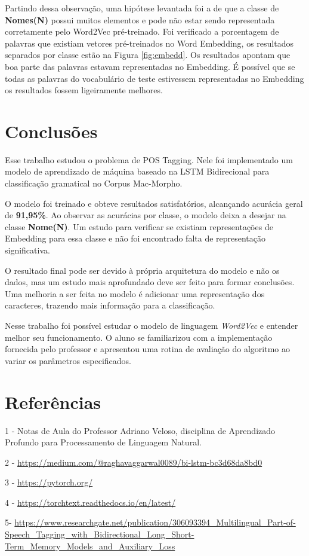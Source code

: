\documentclass[11pt]{scrartcl} %
\begin{document}
Partindo dessa observação, uma hipótese levantada foi a de que a classe de \textbf{Nomes(N)} possui muitos elementos e pode não estar sendo representada corretamente pelo Word2Vec pré-treinado. Foi verificado a porcentagem de palavras que existiam vetores pré-treinados no Word Embedding, os resultados separados por classe estão na Figura \ref{fig:embedd}. Os resultados apontam que boa parte das palavras estavam representadas no Embedding. É possível que se todas as palavras do vocabulário de teste estivessem representadas no Embedding os resultados fossem ligeiramente melhores.

\section{Conclusões}

Esse trabalho estudou o problema de POS Tagging. Nele foi implementado um modelo de aprendizado de máquina baseado na LSTM Bidirecional para classificação gramatical no Corpus Mac-Morpho. 

O modelo foi treinado e obteve resultados satisfatórios, alcançando acurácia geral de \textbf{91,95\%}. Ao observar as acurácias por classe, o modelo deixa a desejar na classe \textbf{Nome(N)}. Um estudo para verificar se existiam representações de Embedding para essa classe e não foi encontrado falta de representação significativa. 

O resultado final pode ser devido à própria arquitetura do modelo e não os dados, mas um estudo mais aprofundado deve ser feito para formar conclusões. Uma melhoria a ser feita no modelo é adicionar uma representação dos caracteres, trazendo mais informação para a classificação. 

Nesse trabalho foi possível estudar o modelo de linguagem \textit{Word2Vec} e entender melhor seu funcionamento. O aluno se familiarizou com a implementação fornecida pelo professor e apresentou uma rotina de avaliação do algoritmo ao variar os parâmetros especificados.


\section{Referências}

1 - Notas de Aula do Professor Adriano Veloso, disciplina de Aprendizado Profundo para Processamento de Linguagem Natural.

2 - \href{https://medium.com/@raghavaggarwal0089/bi-lstm-bc3d68da8bd0}{https://medium.com/@raghavaggarwal0089/bi-lstm-bc3d68da8bd0}

3 - \href{https://pytorch.org/}{https://pytorch.org/}

4 - \href{https://torchtext.readthedocs.io/en/latest/}{https://torchtext.readthedocs.io/en/latest/}

5- \href{https://www.researchgate.net/publication/306093394\_Multilingual\_Part-of-Speech\_Tagging\_with\_Bidirectional\_Long\_Short-Term_Memory\_Models\_and\_Auxiliary_Loss}{https://www.researchgate.net/publication/306093394\_Multilingual\_Part-of-Speech\_Tagging\_with\_Bidirectional\_Long\_Short-Term\_Memory\_Models\_and\_Auxiliary\_Loss}
\end{document}
